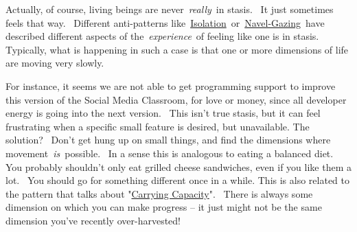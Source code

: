 Actually, of course, living beings are never~\emph{really}~in stasis.~
It just sometimes feels that way.~ Different anti-patterns
like~\href{http://socialmediaclassroom.com/host/peeragogy/forum/anti-patterns-concerns-complaints-and-critiques\#comment-2267}{Isolation}~or~\href{http://socialmediaclassroom.com/host/peeragogy/forum/anti-patterns-concerns-complaints-and-critiques\#comment-1808}{Navel-Gazing}~have
described different aspects of the~\emph{experience}~of feeling like one
is in stasis.~ Typically, what is happening in such a case is that one
or more dimensions of life are moving very slowly.

For instance, it seems we are not able to get programming support to
improve this version of the Social Media Classroom, for love or money,
since all developer energy is going into the next version.~ This isn't
true stasis, but it can feel frustrating when a specific small feature
is desired, but unavailable. The solution?~ Don't get hung up on small
things, and find the dimensions where movement~\emph{is}~possible.~ In a
sense this is analogous to eating a balanced diet.~ You probably
shouldn't only eat grilled cheese sandwiches, even if you like them a
lot.~ You should go for something different once in a while. This is
also related to the pattern that talks about
"\href{http://socialmediaclassroom.com/host/peeragogy/forum/patterns-and-use-cases\#comment-2320}{Carrying
Capacity}".~ There is always some dimension on which you can make
progress -- it just might not be the same dimension you've recently
over-harvested!
